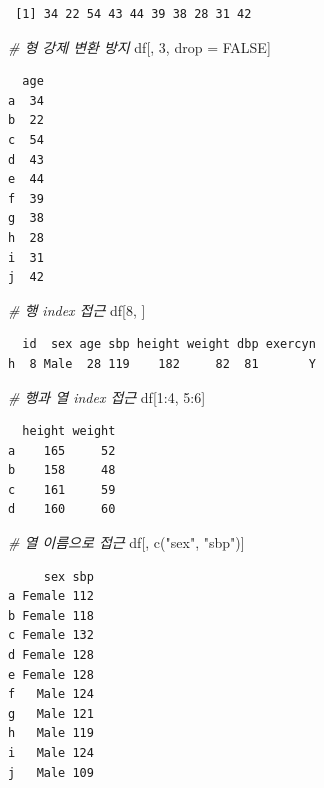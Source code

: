\documentclass[
  11pt,
]{krantz}
\newenvironment{Shaded}{\begin{snugshade}}{\end{snugshade}}
\newcommand{\CommentTok}[1]{\textcolor[rgb]{0.37,0.37,0.37}{\textit{#1}}}
\newcommand{\ConstantTok}[1]{\textcolor[rgb]{0,0,0}{#1}}
\newcommand{\DecValTok}[1]{\textcolor[rgb]{0.06,0.06,0.06}{#1}}
\newcommand{\FunctionTok}[1]{\textcolor[rgb]{0,0,0}{#1}}
\newcommand{\NormalTok}[1]{#1}
\newcommand{\OtherTok}[1]{\textcolor[rgb]{0.37,0.37,0.37}{#1}}
\newcommand{\SpecialCharTok}[1]{\textcolor[rgb]{0,0,0}{#1}}
\newcommand{\StringTok}[1]{\textcolor[rgb]{0.5,0.5,0.5}{#1}}
\begin{document}
\begin{verbatim}
 [1] 34 22 54 43 44 39 38 28 31 42
\end{verbatim}

\begin{Shaded}
\begin{Highlighting}[]
\CommentTok{\# 형 강제 변환 방지}
\NormalTok{df[, }\DecValTok{3}\NormalTok{, drop }\OtherTok{=} \ConstantTok{FALSE}\NormalTok{]}
\end{Highlighting}
\end{Shaded}

\begin{verbatim}
  age
a  34
b  22
c  54
d  43
e  44
f  39
g  38
h  28
i  31
j  42
\end{verbatim}

\begin{Shaded}
\begin{Highlighting}[]
\CommentTok{\# 행 index 접근}
\NormalTok{df[}\DecValTok{8}\NormalTok{, ]}
\end{Highlighting}
\end{Shaded}

\begin{verbatim}
  id  sex age sbp height weight dbp exercyn
h  8 Male  28 119    182     82  81       Y
\end{verbatim}

\begin{Shaded}
\begin{Highlighting}[]
\CommentTok{\# 행과 열 index 접근}
\NormalTok{df[}\DecValTok{1}\SpecialCharTok{:}\DecValTok{4}\NormalTok{, }\DecValTok{5}\SpecialCharTok{:}\DecValTok{6}\NormalTok{]}
\end{Highlighting}
\end{Shaded}

\begin{verbatim}
  height weight
a    165     52
b    158     48
c    161     59
d    160     60
\end{verbatim}

\begin{Shaded}
\begin{Highlighting}[]
\CommentTok{\# 열 이름으로 접근}
\NormalTok{df[, }\FunctionTok{c}\NormalTok{(}\StringTok{"sex"}\NormalTok{, }\StringTok{"sbp"}\NormalTok{)]}
\end{Highlighting}
\end{Shaded}

\begin{verbatim}
     sex sbp
a Female 112
b Female 118
c Female 132
d Female 128
e Female 128
f   Male 124
g   Male 121
h   Male 119
i   Male 124
j   Male 109
\end{verbatim}
\end{document}
